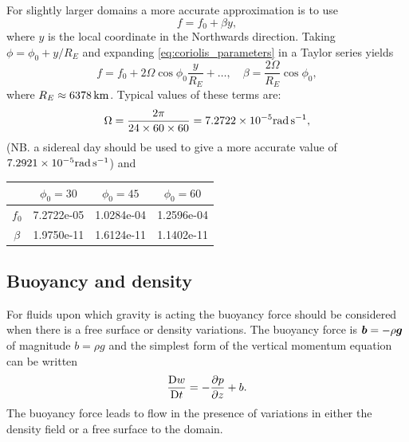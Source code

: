 For slightly larger domains a more accurate approximation is to use
\begin{equation}\label{eq:beta-plane}
f = f_0 + \beta y,
\end{equation}
where $y$ is the local coordinate in the Northwards direction.
Taking $\phi = \phi_0 + y/R_E$ and expanding \eqref{eq:coriolis_parameters} 
in a Taylor series yields
\begin{equation*}
f = f_0 +2\Omega\cos\phi_0\frac{y}{R_E}+\ldots,\quad \beta = \frac{2\Omega}{R_E}\cos\phi_0,
\end{equation*}
where $R_E\approx\unit[6378]{km}$. Typical values of these terms are: 
\begin{equation*}
\Omega = \frac{2\pi}{24\times 60\times 60} = 7.2722\times 10^{-5}\rads[],
\end{equation*}
(NB. a sidereal day should be used to give a more accurate value of $7.2921\times 10^{-5}\rads[]$)
and
\begin{center}\begin{small}
\begin{tabular}{c|ccc}
  &  $\phi_0 = 30$ & $\phi_0=45$ & $\phi_0 = 60$ \\  \hline
 $f_0$  & 7.2722e-05 & 1.0284e-04 & 1.2596e-04 \\
 $\beta$  & 1.9750e-11  &  1.6124e-11  &  1.1402e-11 \\
\end{tabular}\end{small}
\end{center}







\subsection{Buoyancy and density}\label{sect:buoyancy}
For fluids upon which gravity is acting the buoyancy force should be considered
when there is a free surface or density variations. The buoyancy force is $\vec{b}=-\rho\bmg$
of magnitude $b=\rho g$ and the simplest form of the vertical momentum equation can be written
\begin{equation}\label{eq:vertmom}
\DDt[t]{w} = -\ppx[z]{p} + b.
\end{equation}
The buoyancy force leads to flow in the presence of variations in either the density field or
a free surface to the domain.

